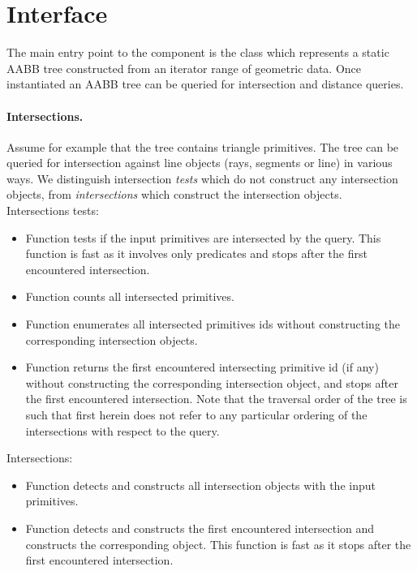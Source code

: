 \section{Interface}
\label{AABB_tree_section_interface}

The main entry point to the component is the class  which represents a static AABB tree constructed from an iterator range of geometric data. Once instantiated an AABB tree can be queried for intersection and distance queries.\\

\paragraph{Intersections.} Assume for example that the tree contains triangle primitives. The tree can be queried for intersection against line objects (rays, segments or line) in various ways. We distinguish intersection \emph{tests} which do not construct any intersection objects, from \emph{intersections} which construct the intersection objects.\\

Intersections tests:
\begin{itemize}
\item Function  tests if the input primitives are intersected by the query. This function is fast as it involves only predicates and stops after the first encountered intersection.
\item Function  counts all intersected primitives.
\item Function  enumerates all intersected primitives ids without constructing the corresponding intersection objects.
\item Function  returns the first encountered intersecting primitive id (if any) without constructing the corresponding intersection object, and stops after the first encountered intersection. Note that the traversal order of the tree is such that first herein does not refer to any particular ordering of the intersections with respect to the query.
\end{itemize}

Intersections:
\begin{itemize}
\item Function  detects and constructs all intersection objects with the input primitives.
\item Function  detects and constructs the first encountered intersection and constructs the corresponding object. This function is fast as it stops after the first encountered intersection.
\end{itemize}

